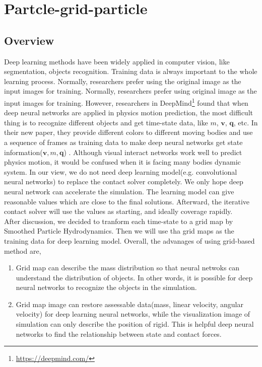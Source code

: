 \chapter{Partcle-grid-particle}
\section{Overview}
    Deep learning methods have been widely applied in computer vision, like segmentation, objects recognition. Training data is always important to the whole learning process. Normally, researchers prefer using the original image as the input images for training. Normally, researchers prefer using original image as the input images for training. However, researchers in DeepMind\footnote{\url{https://deepmind.com/}} found that when deep neural networks are applied in physics motion prediction, the most difficult thing is to recognize different objects and get time-state data, like $m$, $\pmb{v}$, $\pmb{q}$, etc. In their new paper, they provide different colors to different moving bodies and use a sequence of frames as training data to make deep neural networks get state information($\pmb{v}, m, \pmb{q}$) \cite{DBLP:journals/corr/WattersTWPBZ17}.  Although visual interact networks work well to predict physics motion, it would be confused when it is facing many bodies dynamic system. In our view, we do not need deep learning model(e.g. convolutional neural networks) to replace the contact solver completely. We only hope deep neural network can accelerate the simulation. The learning model can give reasonable values which are close to the final solutions. Afterward, the iterative contact solver will use the values as starting, and ideally coverage rapidly. \\

    After discussion, we decided to tranform each time-state to a grid map by Smoothed Particle Hydrodynamics. Then we will use tha grid maps as the training data for deep learning model. Overall, the advanages of using grid-based method are,
    \begin{enumerate}
        \item Grid map can describe the mass distribution so that neural netwoks can understand the distribution of objects. In other words, it is possible for deep neural networks to recognize the objects in the simulation.
        \item Grid map image can restore assessable data(mass, linear velocity, angular velocity) for deep learning neural networks, while the visualization image of simulation can only describe the position of rigid. This is helpful deep neural networks to find the relationship between state and contact forces.
    \end{enumerate}

